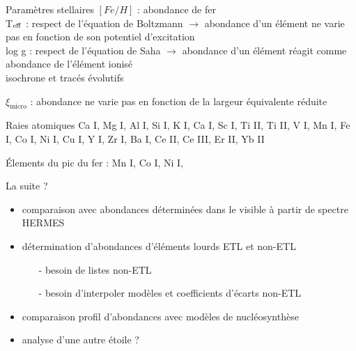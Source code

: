 \documentclass[10pt]{beamer}
\begin{document}
\begin{frame}[fragile]{Paramètres stellaires}
    $[Fe/H]$ : abondance de fer \\

    T$_{\rm eff}$ : respect de l'équation de Boltzmann $\rightarrow$  abondance d'un élément ne varie pas en fonction de son potentiel d'excitation \\


    log g : respect de l'équation de Saha  $\rightarrow$ abondance d'un élément réagit comme abondance de l'élément ionisé \\ isochrone et tracés évolutifs


    $\xi_{\text{micro}}$ : abondance ne varie pas en fonction de la largeur équivalente réduite \\


\end{frame}

\begin{frame}[fragile]{Raies atomiques}
    Ca I, Mg I, Al I, Si I, K I, Ca I, Sc I, Ti II, Ti II, V I, Mn I, Fe I, Co I, Ni I, Cu I, Y I, Zr I, Ba I, Ce II, Ce III, Er II, Yb II

    Élements du pic du fer  : Mn I, Co I, Ni I, 
\end{frame}

\begin{frame}[fragile]{La suite ?}
    \begin{itemize}
        \item comparaison avec abondances déterminées dans le visible à partir de spectre HERMES
        \item détermination  d'abondances d'éléments lourds ETL et non-ETL
        \begin{itemize}
            \item [-] besoin de listes non-ETL
            \item [-] besoin d'interpoler modèles et coefficients d'écarts non-ETL
        \end{itemize}
        \item comparaison profil d'abondances avec modèles de nucléosynthèse
        \item analyse d'une autre étoile ?
    \end{itemize} 
\end{frame}
\end{document}
